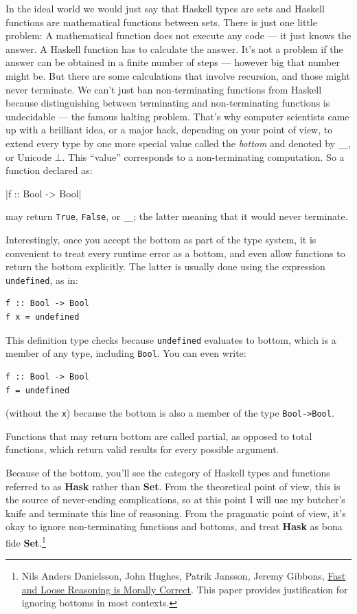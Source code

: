 In the ideal world we would just say that Haskell types are sets and
Haskell functions are mathematical functions between sets. There is just
one little problem: A mathematical function does not execute any code
--- it just knows the answer. A Haskell function has to calculate the
answer. It's not a problem if the answer can be obtained in a finite
number of steps --- however big that number might be. But there are some
calculations that involve recursion, and those might never terminate. We
can't just ban non-terminating functions from Haskell because
distinguishing between terminating and non-terminating functions is
undecidable --- the famous halting problem. That's why computer
scientists came up with a brilliant idea, or a major hack, depending on
your point of view, to extend every type by one more special value
called the \emph{bottom} and denoted by \texttt{\_\textbar{}\_}, or
Unicode \ensuremath{\bot}. This ``value'' corresponds to a non-terminating computation.
So a function declared as:

|f :: Bool -> Bool|

may return \texttt{True}, \texttt{False}, or \texttt{\_\textbar{}\_};
the latter meaning that it would never terminate.

Interestingly, once you accept the bottom as part of the type system, it
is convenient to treat every runtime error as a bottom, and even allow
functions to return the bottom explicitly. The latter is usually done
using the expression \texttt{undefined}, as in:

\begin{verbatim}
f :: Bool -> Bool
f x = undefined
\end{verbatim}

This definition type checks because \texttt{undefined} evaluates to
bottom, which is a member of any type, including \texttt{Bool}. You can
even write:

\begin{verbatim}
f :: Bool -> Bool
f = undefined
\end{verbatim}

(without the \texttt{x}) because the bottom is also a member of the type
\texttt{Bool->Bool}.

Functions that may return bottom are called partial, as opposed to total
functions, which return valid results for every possible argument.

Because of the bottom, you'll see the category of Haskell types and
functions referred to as \textbf{Hask} rather than \textbf{Set}. From
the theoretical point of view, this is the source of never-ending
complications, so at this point I will use my butcher's knife and
terminate this line of reasoning. From the pragmatic point of view, it's
okay to ignore non-terminating functions and bottoms, and treat
\textbf{Hask} as bona fide \textbf{Set}.\footnote{Nils Anders Danielsson,
John Hughes, Patrik Jansson, Jeremy Gibbons, \href{http://www.cs.ox.ac.uk/jeremy.gibbons/publications/fast+loose.pdf}{
Fast and Loose Reasoning is Morally Correct}. This paper provides justification for ignoring bottoms in most contexts.}


